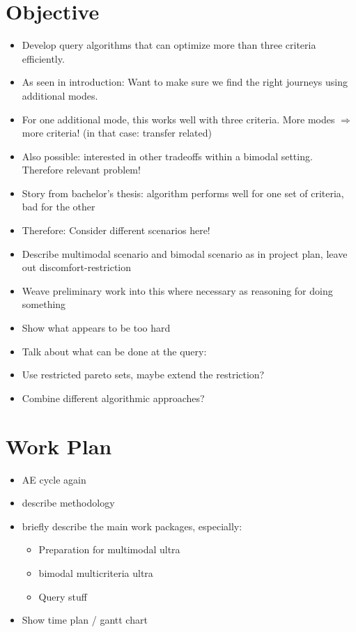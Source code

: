 \documentclass[a4paper,USenglish,cleveref, autoref, thm-restate]{lipics-v2021}
\begin{document}
\section{Objective}
\begin{itemize}
    \item Develop query algorithms that can optimize more than three criteria efficiently.
    \item As seen in introduction: Want to make sure we find the right journeys using additional modes.
    \item For one additional mode, this works well with three criteria. More modes $\Rightarrow$ more criteria! (in that case: transfer related)
    \item Also possible: interested in other tradeoffs within a bimodal setting. Therefore relevant problem!
    \item Story from bachelor's thesis: algorithm performs well for one set of criteria, bad for the other
    \item Therefore: Consider different scenarios here!
    \item Describe multimodal scenario and bimodal scenario as in project plan, leave out discomfort-restriction
    \item Weave preliminary work into this where necessary as reasoning for doing something
    \item Show what appears to be too hard
    \item Talk about what can be done at the query: 
    \item Use restricted pareto sets, maybe extend the restriction?
    \item Combine different algorithmic approaches?
\end{itemize}

\section{Work Plan}
\begin{itemize}
    \item AE cycle again
    \item describe methodology
    \item briefly describe the main work packages, especially:
    \begin{itemize}
        \item Preparation for multimodal ultra
        \item bimodal multicriteria ultra
        \item Query stuff
    \end{itemize}
    \item Show time plan / gantt chart
\end{itemize}

%
%

\end{document}
